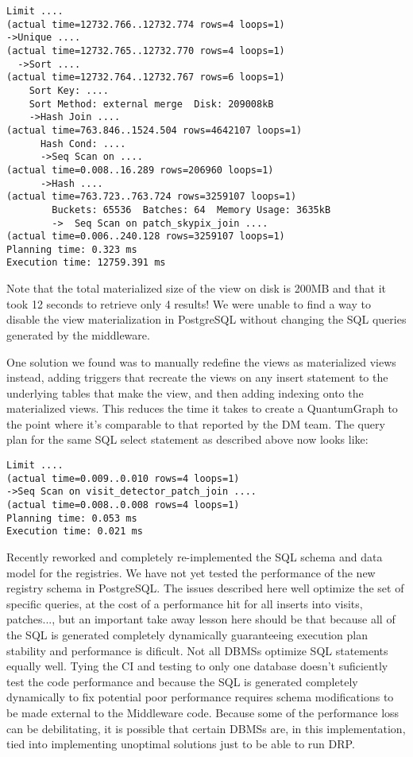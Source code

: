 \begin{lstlisting}[style=sqlprompt]
Limit ....
(actual time=12732.766..12732.774 rows=4 loops=1)
->Unique ....
(actual time=12732.765..12732.770 rows=4 loops=1)
  ->Sort ....
(actual time=12732.764..12732.767 rows=6 loops=1)
    Sort Key: ....
    Sort Method: external merge  Disk: 209008kB
    ->Hash Join ....
(actual time=763.846..1524.504 rows=4642107 loops=1)
      Hash Cond: ....
      ->Seq Scan on ....
(actual time=0.008..16.289 rows=206960 loops=1)
      ->Hash ....
(actual time=763.723..763.724 rows=3259107 loops=1)
        Buckets: 65536  Batches: 64  Memory Usage: 3635kB
        ->  Seq Scan on patch_skypix_join ....
(actual time=0.006..240.128 rows=3259107 loops=1)
Planning time: 0.323 ms
Execution time: 12759.391 ms
\end{lstlisting}

Note that the total materialized size of the view on disk is 200MB and that it took 12 seconds to retrieve only 4 results!
We were unable to find a way to disable the view materialization in PostgreSQL without changing the SQL queries generated by the middleware.

One solution we found was to manually redefine the views as materialized views instead, adding triggers that recreate the views on any insert statement to the underlying tables that make the view, and then adding indexing onto the materialized views.
This reduces the time it takes to create a QuantumGraph to the point where it's comparable to that reported by the DM team.
The query plan for the same SQL select statement as described above now looks like:

\begin{lstlisting}[style=sqlprompt]
Limit ....
(actual time=0.009..0.010 rows=4 loops=1)
->Seq Scan on visit_detector_patch_join ....
(actual time=0.008..0.008 rows=4 loops=1)
Planning time: 0.053 ms
Execution time: 0.021 ms
\end{lstlisting}

Recently  reworked and completely re-implemented the SQL schema and data model for the registries.
We have not yet tested the performance of the new registry schema in PostgreSQL.
The issues described here well optimize the set of specific queries, at the cost of a performance hit for all inserts into visits, patches..., but an important take away lesson here should be that because all of the SQL is generated completely dynamically guaranteeing execution plan stability and performance is dificult.
Not all DBMSs optimize SQL statements equally well.
Tying the CI and testing to only one database doesn't suficiently test the code performance and because the SQL is generated completely dynamically to fix potential poor performance requires schema modifications to be made external to the Middleware code.
Because some of the performance loss can be debilitating, it is possible that certain DBMSs are, in this implementation, tied into implementing unoptimal solutions just to be able to run DRP.

